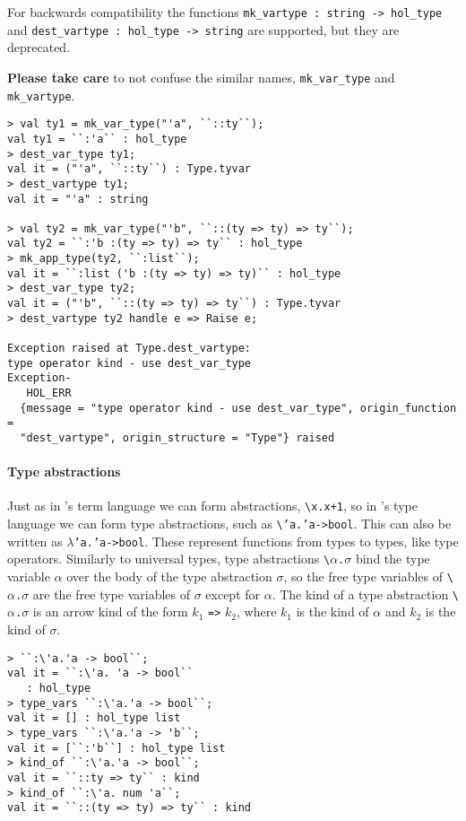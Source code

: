 For backwards compatibility the \HOL{} functions
\texttt{mk\_vartype~{:}~string -> hol\_type}
and
\texttt{dest\_vartype~{:}~hol\_type -> string}
are supported,
but they are deprecated.

{\bf Please take care} to not confuse the
similar names, \texttt{mk\_var\_type} and \texttt{mk\_vartype}.
%
\begin{session}
\begin{verbatim}
> val ty1 = mk_var_type("'a", ``::ty``);
val ty1 = ``:'a`` : hol_type
> dest_var_type ty1;
val it = ("'a", ``::ty``) : Type.tyvar
> dest_vartype ty1;
val it = "'a" : string

> val ty2 = mk_var_type("'b", ``::(ty => ty) => ty``);
val ty2 = ``:'b :(ty => ty) => ty`` : hol_type
> mk_app_type(ty2, ``:list``);
val it = ``:list ('b :(ty => ty) => ty)`` : hol_type
> dest_var_type ty2;
val it = ("'b", ``::(ty => ty) => ty``) : Type.tyvar
> dest_vartype ty2 handle e => Raise e;

Exception raised at Type.dest_vartype:
type operator kind - use dest_var_type
Exception-
   HOL_ERR
  {message = "type operator kind - use dest_var_type", origin_function =
  "dest_vartype", origin_structure = "Type"} raised
\end{verbatim}
\end{session}


\paragraph{Type abstractions}

Just as in \HOL{}'s term language we can form abstractions,
{\small\verb|\|}\texttt{x.x+1},
so in \HOLW{}'s type language we can form type abstractions,
such as {\small\verb|\|}\texttt{'a.'a->bool}.
This can also be written as $\lambda$\texttt{'a.'a->bool}.
These represent functions from types to types, like type operators.
Similarly to universal types, type abstractions
{\small\verb|\|}$\alpha$\texttt{.}$\sigma$ bind the type variable
$\alpha$ over the body of the type abstraction $\sigma$, so the 
free type variables of {\small\verb|\|}$\alpha$\texttt{.}$\sigma$
are the free type variables of $\sigma$ except for $\alpha$.
The kind of a type abstraction {\small\verb|\|}$\alpha$\texttt{.}$\sigma$
is an arrow kind of the form $k_1$ \texttt{=>} $k_2$,
where $k_1$ is the kind of $\alpha$ and $k_2$ is the kind of $\sigma$.
%
\begin{session}
\begin{verbatim}
> ``:\'a.'a -> bool``;
val it = ``:\'a. 'a -> bool``
   : hol_type
> type_vars ``:\'a.'a -> bool``;
val it = [] : hol_type list
> type_vars ``:\'a.'a -> 'b``;
val it = [``:'b``] : hol_type list
> kind_of ``:\'a.'a -> bool``;
val it = ``::ty => ty`` : kind
> kind_of ``:\'a. num 'a``;
val it = ``::(ty => ty) => ty`` : kind
\end{verbatim}
\end{session}


